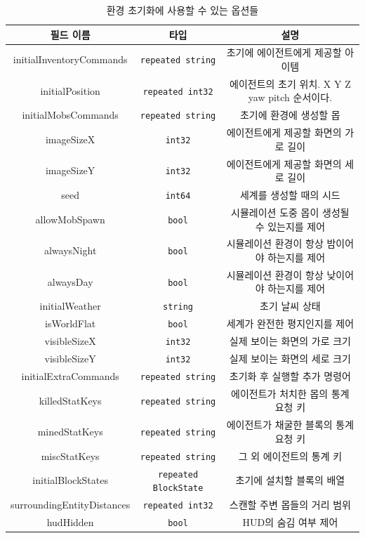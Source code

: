 \documentclass[oneside, under, ko]{snuthesis}
\begin{document}
\begin{table}
    \renewcommand{\arraystretch}{1.5} %
    \centering
    \begin{tabular}{|c|c|c|}
      \hline
      \textbf{필드 이름} & \textbf{타입} & \textbf{설명} \\
      \hline
      initialInventoryCommands & \texttt{repeated string} & 초기에 에이전트에게 제공할 아이템 \\\hline
      initialPosition & \texttt{repeated int32} & 에이전트의 초기 위치. X Y Z yaw pitch 순서이다. \\\hline
      initialMobsCommands & \texttt{repeated string} & 초기에 환경에 생성할 몹 \\\hline
      imageSizeX & \texttt{int32} & 에이전트에게 제공할 화면의 가로 길이 \\\hline
      imageSizeY & \texttt{int32} & 에이전트에게 제공할 화면의 세로 길이 \\\hline
      seed & \texttt{int64} & 세계를 생성할 때의 시드 \\\hline
      allowMobSpawn & \texttt{bool} & 시뮬레이션 도중 몹이 생성될 수 있는지를 제어 \\\hline
      alwaysNight & \texttt{bool} & 시뮬레이션 환경이 항상 밤이어야 하는지를 제어 \\\hline
      alwaysDay & \texttt{bool} & 시뮬레이션 환경이 항상 낮이어야 하는지를 제어 \\\hline
      initialWeather & \texttt{string} & 초기 날씨 상태 \\\hline
      isWorldFlat & \texttt{bool} & 세계가 완전한 평지인지를 제어 \\\hline
      visibleSizeX & \texttt{int32} & 실제 보이는 화면의 가로 크기 \\\hline
      visibleSizeY & \texttt{int32} & 실제 보이는 화면의 세로 크기 \\\hline
      initialExtraCommands & \texttt{repeated string} & 초기화 후 실행할 추가 명령어 \\\hline
      killedStatKeys & \texttt{repeated string} & 에이전트가 처치한 몹의 통계 요청 키 \\\hline
      minedStatKeys & \texttt{repeated string} & 에이전트가 채굴한 블록의 통계 요청 키  \\\hline
      miscStatKeys & \texttt{repeated string} & 그 외 에이전트의 통계 키 \\\hline
      initialBlockStates & \texttt{repeated BlockState} & 초기에 설치할 블록의 배열  \\\hline
      surroundingEntityDistances & \texttt{repeated int32} & 스캔할 주변 몹들의 거리 범위 \\\hline
      hudHidden & \texttt{bool} & HUD의 숨김 여부 제어 \\
      \hline
    \end{tabular}
    \caption{환경 초기화에 사용할 수 있는 옵션들}
    \label{tab:initial_environment}
  \end{table}
\end{document}
